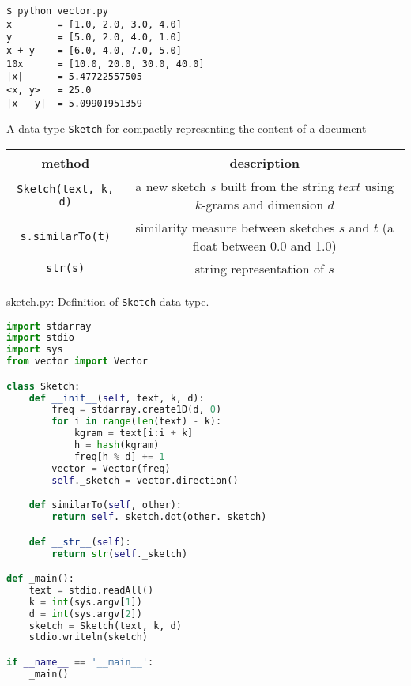 \documentclass[8pt,a4paper,compress]{beamer}
\begin{document}
\begin{frame}[fragile]
\pause

\begin{lstlisting}[language={}]
$ python vector.py
x        = [1.0, 2.0, 3.0, 4.0]
y        = [5.0, 2.0, 4.0, 1.0]
x + y    = [6.0, 4.0, 7.0, 5.0]
10x      = [10.0, 20.0, 30.0, 40.0]
|x|      = 5.47722557505
<x, y>   = 25.0
|x - y|  = 5.09901951359
\end{lstlisting}
\end{frame}

\begin{frame}[fragile]
\pause

A data type \lstinline{Sketch} for compactly representing the content of a document
\begin{center}
\begin{tabular}{cc}
method & description \\ \hline
\lstinline$Sketch(text, k, d)$ & \makecell{a new sketch $s$ built from the string $text$ \\ using $k$-grams and dimension $d$} \\
\lstinline$s.similarTo(t)$ & \makecell{similarity measure between sketches $s$ and $t$ (a float \\ between 0.0 and 1.0)} \\
\lstinline$str(s)$ & string representation of $s$
\end{tabular} 
\end{center}
\end{frame}

\begin{frame}[fragile]
\pause

\begin{framed}
\tiny sketch.py: Definition of \lstinline{Sketch} data type. 
\end{framed}

\begin{lstlisting}[language=Python]
import stdarray
import stdio
import sys
from vector import Vector

class Sketch:
    def __init__(self, text, k, d):
        freq = stdarray.create1D(d, 0)
        for i in range(len(text) - k):
            kgram = text[i:i + k]
            h = hash(kgram)
            freq[h % d] += 1
        vector = Vector(freq)
        self._sketch = vector.direction()

    def similarTo(self, other):
        return self._sketch.dot(other._sketch)

    def __str__(self):
        return str(self._sketch)

def _main():
    text = stdio.readAll()
    k = int(sys.argv[1])
    d = int(sys.argv[2])
    sketch = Sketch(text, k, d)
    stdio.writeln(sketch)

if __name__ == '__main__':
    _main()
\end{lstlisting}
\end{frame}
\end{document}
